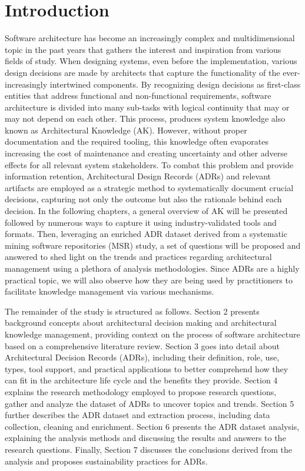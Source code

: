 
\chapter{Introduction}
    Software architecture has become an increasingly complex and multidimensional topic in the past years that gathers the interest and inspiration from various fields of study. When designing systems, even before the implementation, various design decisions are made by architects that capture the functionality of the ever-increasingly intertwined components. By recognizing design decisions as first-class entities that address functional and non-functional requirements, software architecture is divided into many sub-tasks with logical continuity that may or may not depend on each other.\cite{Arch+DesignDescisions} This process, produces system knowledge also known as Architectural Knowledge (AK). However, without proper documentation and the required tooling, this knowledge often evaporates increasing the cost of maintenance and creating uncertainty and other adverse effects for all relevant system stakeholders. To combat this problem and provide information retention,  Architectural Design Records (ADRs) and relevant artifacts are employed as a strategic method to systematically document crucial decisions, capturing not only the outcome but also the rationale behind each decision. In the following chapters, a general overview of AK will be presented followed by numerous ways to capture it using industry-validated tools and formats. Then, leveraging an enriched ADR dataset derived from a systematic mining software repositories (MSR) study, a set of questions will be proposed and answered to shed light on the trends and practices regarding architectural management using a plethora of analysis methodologies. Since ADRs are a highly practical topic, we will also observe how they are being used by practitioners to facilitate knowledge management via various mechanisms.

    The remainder of the study is structured as follows. Section 2 presents background concepts about architectural decision making and architectural knowledge management, providing context on the process of software architecture based on a comprehensive literature review. Section 3 goes into detail about Architectural Decision Records (ADRs), including their definition, role, use, types, tool support, and practical applications to better comprehend how they can fit in the architecture life cycle and the benefits they provide. Section 4 explains the research methodology employed to propose research questions, gather and analyze the dataset of ADRs to uncover topics and trends. Section 5 further describes the ADR dataset and extraction process, including data collection, cleaning and enrichment. Section 6 presents the ADR dataset analysis, explaining the analysis methods and discussing the results and answers to the research questions. Finally, Section 7 discusses the conclusions derived from the analysis and proposes sustainability practices for ADRs.